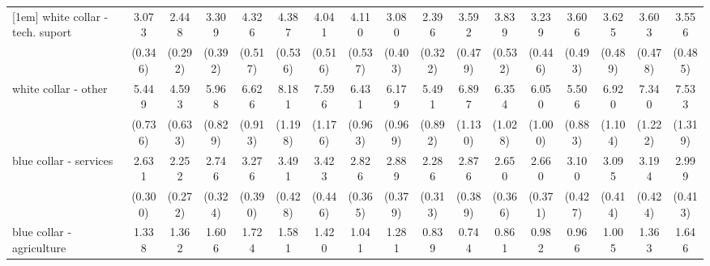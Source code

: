 {\begin{tabular}{l*{16}{c}}
[1em]
white collar - tech. suport&       3.073\sym{***}&       2.448\sym{***}&       3.309\sym{***}&       4.326\sym{***}&       4.387\sym{***}&       4.041\sym{***}&       4.110\sym{***}&       3.080\sym{***}&       2.396\sym{***}&       3.592\sym{***}&       3.839\sym{***}&       3.239\sym{***}&       3.606\sym{***}&       3.625\sym{***}&       3.603\sym{***}&       3.556\sym{***}\\
                    &     (0.346)         &     (0.292)         &     (0.392)         &     (0.517)         &     (0.536)         &     (0.516)         &     (0.537)         &     (0.403)         &     (0.322)         &     (0.479)         &     (0.532)         &     (0.446)         &     (0.493)         &     (0.489)         &     (0.478)         &     (0.485)         \\
[1em]
white collar - other&       5.449\sym{***}&       4.593\sym{***}&       5.968\sym{***}&       6.626\sym{***}&       8.181\sym{***}&       7.596\sym{***}&       6.431\sym{***}&       6.179\sym{***}&       5.491\sym{***}&       6.897\sym{***}&       6.354\sym{***}&       6.050\sym{***}&       5.506\sym{***}&       6.920\sym{***}&       7.340\sym{***}&       7.533\sym{***}\\
                    &     (0.736)         &     (0.633)         &     (0.829)         &     (0.913)         &     (1.198)         &     (1.176)         &     (0.963)         &     (0.969)         &     (0.892)         &     (1.130)         &     (1.028)         &     (1.000)         &     (0.883)         &     (1.104)         &     (1.222)         &     (1.319)         \\
[1em]
blue collar - services&       2.631\sym{***}&       2.252\sym{***}&       2.746\sym{***}&       3.276\sym{***}&       3.491\sym{***}&       3.423\sym{***}&       2.826\sym{***}&       2.889\sym{***}&       2.286\sym{***}&       2.876\sym{***}&       2.650\sym{***}&       2.660\sym{***}&       3.100\sym{***}&       3.095\sym{***}&       3.194\sym{***}&       2.999\sym{***}\\
                    &     (0.300)         &     (0.272)         &     (0.324)         &     (0.390)         &     (0.428)         &     (0.446)         &     (0.365)         &     (0.379)         &     (0.313)         &     (0.389)         &     (0.366)         &     (0.371)         &     (0.427)         &     (0.414)         &     (0.424)         &     (0.413)         \\
[1em]
blue collar - agriculture&       1.338         &       1.362         &       1.606\sym{**} &       1.724\sym{**} &       1.581\sym{*}  &       1.420         &       1.041         &       1.281         &       0.839         &       0.744         &       0.861         &       0.982         &       0.966         &       1.005         &       1.363         &       1.646\sym{*}  \\

\end{tabular}}
